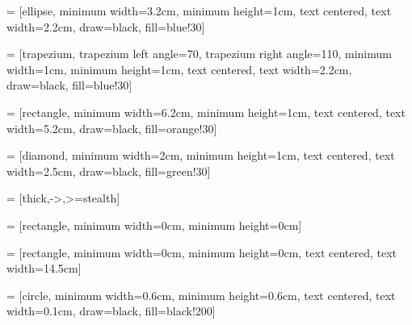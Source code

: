 \usepackage{dirtytalk}
\usepackage{svg}
\usepackage{amsmath}
\usepackage{xcolor}

\usepackage{afterpage}

\newcommand\blankpage{%
   \null
   \thispagestyle{empty}%
   \addtocounter{page}{-1}%
   \newpage}
% 

\usepackage{tikz}
\usetikzlibrary{shapes.geometric, arrows}

 = [ellipse, minimum width=3.2cm, minimum height=1cm, text centered, text width=2.2cm, draw=black, fill=blue!30]


 = [trapezium, trapezium left angle=70, trapezium right angle=110, minimum width=1cm, minimum height=1cm, text centered, text width=2.2cm, draw=black, fill=blue!30]

 = [rectangle, minimum width=6.2cm, minimum height=1cm, text centered, text width=5.2cm, draw=black, fill=orange!30]

 = [diamond, minimum width=2cm, minimum height=1cm, text centered, text width=2.5cm, draw=black, fill=green!30]

 = [thick,->,>=stealth]

 = [rectangle, minimum width=0cm, minimum height=0cm]

 = [rectangle, minimum width=0cm, minimum height=0cm, text centered, text width=14.5cm]

 = [circle, minimum width=0.6cm, minimum height=0.6cm, text centered, text width=0.1cm, draw=black, fill=black!200]


    \pagestyle{empty}
    
    
    
    
    \titlespacing{\chapter}{0.5cm}{1cm}{0.5cm}
    \setlength\parindent{0em}
    \begingroup
        \let\cleardoublepage\clearpage %
        \tableofcontents
    \endgroup
    \clearpage
    
